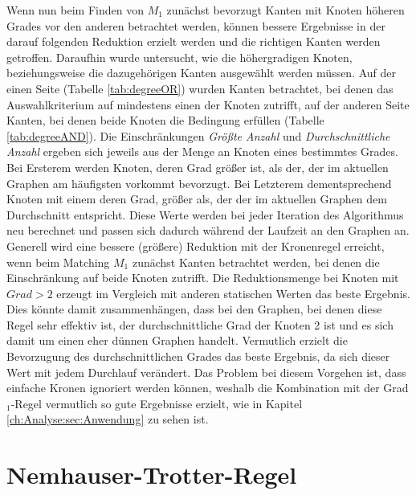 Wenn nun beim Finden von $M_{1}$ zunächst bevorzugt Kanten mit Knoten höheren Grades vor den anderen betrachtet werden, können bessere Ergebnisse in der darauf folgenden Reduktion erzielt werden und die richtigen Kanten werden getroffen. Daraufhin wurde untersucht, wie die höhergradigen Knoten, beziehungsweise die dazugehörigen Kanten ausgewählt werden müssen. Auf der einen Seite (Tabelle \ref{tab:degreeOR}) wurden Kanten betrachtet, bei denen das Auswahlkriterium auf mindestens einen der Knoten zutrifft, auf der anderen Seite Kanten, bei denen beide Knoten die Bedingung erfüllen (Tabelle \ref{tab:degreeAND}). Die Einschränkungen \emph{Größte Anzahl} und \emph{Durchschnittliche Anzahl} ergeben sich jeweils aus der Menge an Knoten eines bestimmtes Grades. Bei Ersterem werden Knoten, deren Grad größer ist, als der, der im aktuellen Graphen am häufigsten vorkommt bevorzugt. Bei Letzterem dementsprechend Knoten mit einem deren Grad, größer als, der der im aktuellen Graphen dem Durchschnitt entspricht. Diese Werte werden bei jeder Iteration des Algorithmus neu berechnet und passen sich dadurch während der Laufzeit an den Graphen an.\\ 
Generell wird eine bessere (größere) Reduktion mit der Kronenregel erreicht, wenn beim Matching $M_{1}$ zunächst Kanten betrachtet werden, bei denen die Einschränkung auf beide Knoten zutrifft. Die Reduktionsmenge bei Knoten mit $Grad>2$ erzeugt im Vergleich mit anderen statischen Werten das beste Ergebnis. Dies könnte damit zusammenhängen, dass bei den Graphen, bei denen diese Regel sehr effektiv ist, der durchschnittliche Grad der Knoten 2 ist und es sich damit um einen eher dünnen Graphen handelt. Vermutlich erzielt die Bevorzugung des durchschnittlichen Grades das beste Ergebnis, da sich dieser Wert mit jedem Durchlauf verändert.
Das Problem bei diesem Vorgehen ist, dass einfache Kronen ignoriert werden können, weshalb die Kombination mit der Grad$_{1}$-Regel vermutlich so gute Ergebnisse erzielt, wie in Kapitel \ref{ch:Analyse:sec:Anwendung} zu sehen ist.
\newpage




\section{Nemhauser-Trotter-Regel}
\label{ch:Implementierung:sec:Trott}

